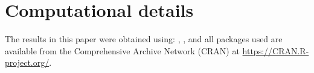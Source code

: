 \documentclass[article]{jss}
\begin{document}
\section*{Computational details}

The results in this paper were obtained using:  \cite{ggplot2},  \cite{cmahalanobis},  \cite{reshape} and all packages used are available from the Comprehensive
 Archive Network (CRAN) at
\url{https://CRAN.R-project.org/}.








\end{document}
